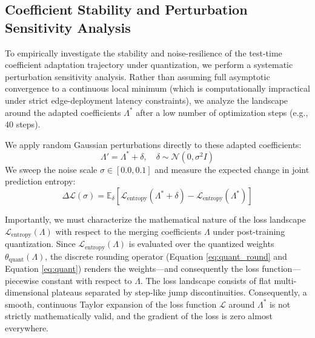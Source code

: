 \subsection{Coefficient Stability and Perturbation Sensitivity Analysis}
To empirically investigate the stability and noise-resilience of the test-time coefficient adaptation trajectory under quantization, we perform a systematic perturbation sensitivity analysis. Rather than assuming full asymptotic convergence to a continuous local minimum (which is computationally impractical under strict edge-deployment latency constraints), we analyze the landscape around the adapted coefficients $\Lambda^*$ after a low number of optimization steps (e.g., $40$ steps).

We apply random Gaussian perturbations directly to these adapted coefficients:
\begin{equation}
\label{eq:perturb}
\Lambda' = \Lambda^* + \delta, \quad \delta \sim \mathcal{N}(0, \sigma^2 I)
\end{equation}
We sweep the noise scale $\sigma \in [0.0, 0.1]$ and measure the expected change in joint prediction entropy:
\begin{equation}
\label{eq:entropy_diff}
\Delta \mathcal{L}(\sigma) = \mathbb{E}_{\delta}\left[ \mathcal{L}_{\text{entropy}}(\Lambda^* + \delta) - \mathcal{L}_{\text{entropy}}(\Lambda^*) \right]
\end{equation}

Importantly, we must characterize the mathematical nature of the loss landscape $\mathcal{L}_{\text{entropy}}(\Lambda)$ with respect to the merging coefficients $\Lambda$ under post-training quantization. Since $\mathcal{L}_{\text{entropy}}(\Lambda)$ is evaluated over the quantized weights $\theta_{\text{quant}}(\Lambda)$, the discrete rounding operator (Equation \ref{eq:quant_round} and Equation \ref{eq:quant}) renders the weights---and consequently the loss function---piecewise constant with respect to $\Lambda$. The loss landscape consists of flat multi-dimensional plateaus separated by step-like jump discontinuities. Consequently, a smooth, continuous Taylor expansion of the loss function $\mathcal{L}$ around $\Lambda^*$ is not strictly mathematically valid, and the gradient of the loss is zero almost everywhere.

